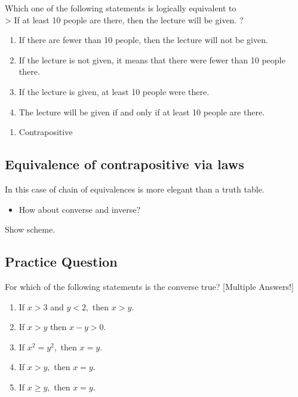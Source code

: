 \documentclass[11pt]{article}
\providecommand{\tightlist}{%
      \setlength{\itemsep}{0pt}\setlength{\parskip}{0pt}}
\begin{document}
Which one of the following statements is logically equivalent to\\
\textgreater{} If at least 10 people are there, then the lecture will be
given. ?

\begin{enumerate}
\def\labelenumi{\alph{enumi}.}
\tightlist
\item
  If there are fewer than 10 people, then the lecture will not be
  given.\\
\item
  If the lecture is not given, it means that there were fewer than 10
  people there.\\
\item
  If the lecture is given, at least 10 people were there.\\
\item
  The lecture will be given if and only if at least 10 people are there.
\end{enumerate}

    \begin{enumerate}
\def\labelenumi{\alph{enumi}.}
\setcounter{enumi}{1}
\tightlist
\item
  Contrapositive
\end{enumerate}

    \subsection{Equivalence of contrapositive via
laws}\label{equivalence-of-contrapositive-via-laws}

In this case of chain of equivalences is more elegant than a truth
table.

    \begin{itemize}
\tightlist
\item
  How about converse and inverse?
\end{itemize}

    Show scheme.

    \subsection{Practice Question}\label{practice-question}

For which of the following statements is the converse true? {[}Multiple
Answers!{]}

\begin{enumerate}
\def\labelenumi{\alph{enumi}.}
\tightlist
\item
  If \(x > 3\) and \(y < 2,\) then \(x > y.\)\\
\item
  If \(x > y\) then \(x - y > 0.\)\\
\item
  If \(x^2 = y^2,\) then \(x = y.\)\\
\item
  If \(x > y,\) then \(x = y.\)\\
\item
  If \(x \geq y,\) then \(x=y.\)
\end{enumerate}
\end{document}
